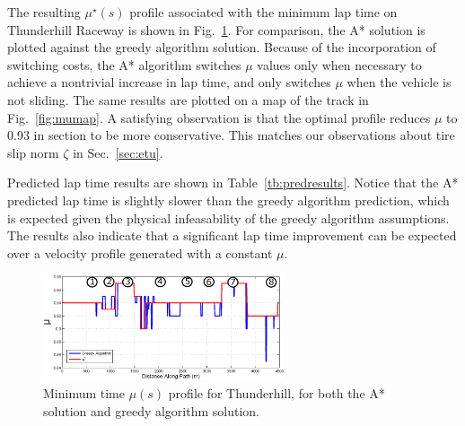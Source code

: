 \documentclass[9pt,shortpaper,twoside,web]{ieeecolor}
\newcommand*\circled[1]{\tikz[baseline=(char.base)]{
            \node[shape=circle,draw,inner sep=2pt] (char) {#1};}}
\begin{document}

 The resulting $\mu^\star(s)$ profile associated with the minimum lap time on Thunderhill Raceway is shown in Fig.~\ref{fig:muprof}. For  comparison, the A* solution is plotted against the greedy algorithm solution. Because of the incorporation of switching costs,  the A* algorithm switches $\mu$ values only when necessary to achieve a nontrivial increase in lap time, and only switches $\mu$ when  the vehicle is not sliding. The same results are plotted on a map of the track in Fig.~\ref{fig:mumap}. A satisfying observation is that the optimal profile reduces $\mu$ to 0.93 in section \circled{2} to be more conservative. This matches our observations about tire slip norm $\zeta$ in Sec.~\ref{sec:etu}. 
 
 Predicted lap time results are shown in Table~\ref{tb:predresults}. Notice that the A* predicted lap time is slightly
 slower than the greedy algorithm prediction, which is expected given the physical infeasability of the greedy algorithm assumptions. The  results also indicate that a significant lap time improvement can be expected over a velocity profile generated with a constant $\mu$.
 
 \begin{figure}[tb]
\centering
\includegraphics[width=2.8in]{figures/muprofile.eps}
\caption{Minimum time $\mu(s)$ profile for Thunderhill, for both the A* solution and greedy algorithm solution.}
\label{fig:muprof}
\end{figure}  
\end{document}

